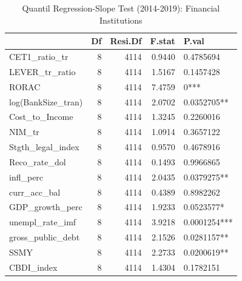 \begin{table}[ht]
\centering
\caption{Quantil Regression-Slope Test (2014-2019): Financial Institutions} 
\begingroup\small
\begin{tabular}{lrrrl}
  \toprule
 & Df & Resi.Df & F.stat & P.val \\ 
  \midrule
CET1\_ratio\_tr & 8 & 4114 & 0.9440 & 0.4785694 \\ 
  LEVER\_tr\_ratio & 8 & 4114 & 1.5167 & 0.1457428 \\ 
  RORAC & 8 & 4114 & 7.4759 & 0*** \\ 
  log(BankSize\_tran) & 8 & 4114 & 2.0702 & 0.0352705** \\ 
  Cost\_to\_Income & 8 & 4114 & 1.3245 & 0.2260016 \\ 
  NIM\_tr & 8 & 4114 & 1.0914 & 0.3657122 \\ 
  Stgth\_legal\_index & 8 & 4114 & 0.9570 & 0.4678916 \\ 
  Reco\_rate\_dol & 8 & 4114 & 0.1493 & 0.9966865 \\ 
  infl\_perc & 8 & 4114 & 2.0435 & 0.0379275** \\ 
  curr\_acc\_bal & 8 & 4114 & 0.4389 & 0.8982262 \\ 
  GDP\_growth\_perc & 8 & 4114 & 1.9233 & 0.0523577* \\ 
  unempl\_rate\_imf & 8 & 4114 & 3.9218 & 0.0001254*** \\ 
  gross\_public\_debt & 8 & 4114 & 2.1526 & 0.0281157** \\ 
  SSMY & 8 & 4114 & 2.2733 & 0.0200619** \\ 
  CBDI\_index & 8 & 4114 & 1.4304 & 0.1782151 \\ 
   \bottomrule
\end{tabular}
\endgroup
\end{table}
